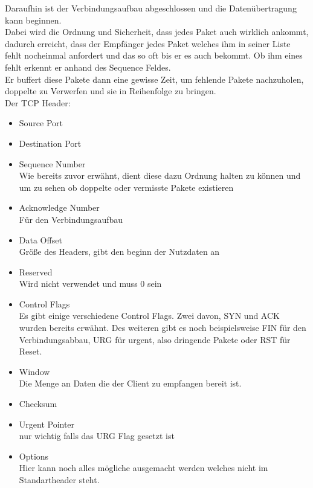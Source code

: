 \documentclass[12pt,a4paper]{report}
\begin{document}
Daraufhin ist der Verbindungsaufbau abgeschlossen und die Datenübertragung kann beginnen.\\
Dabei wird die Ordnung und Sicherheit, dass jedes Paket auch wirklich ankommt, dadurch erreicht, dass der Empfänger jedes Paket welches ihm in seiner Liste fehlt nocheinmal anfordert und das so oft bis er es auch bekommt. Ob ihm eines fehlt erkennt er anhand des Sequence Feldes.\\
Er buffert diese Pakete dann eine gewisse Zeit, um fehlende Pakete nachzuholen, doppelte zu Verwerfen und sie in Reihenfolge zu bringen.\\

Der TCP Header:\\
\begin{itemize}
\item Source Port
\item Destination Port
\item Sequence Number\\
Wie bereits zuvor erwähnt, dient diese dazu Ordnung halten zu können und um zu sehen ob doppelte oder vermisste Pakete existieren
\item Acknowledge Number\\
Für den Verbindungsaufbau
\item Data Offset\\
Größe des Headers, gibt den beginn der Nutzdaten an
\item Reserved\\
Wird nicht verwendet und muss 0 sein
\item Control Flags\\
Es gibt einige verschiedene Control Flags. Zwei davon, SYN und ACK wurden bereits erwähnt. Des weiteren gibt es noch beispielsweise FIN für den Verbindungsabbau, URG für urgent, also dringende Pakete oder RST für Reset.
\item Window \\
Die Menge an Daten die der Client zu empfangen bereit ist.
\item Checksum
\item Urgent Pointer\\
nur wichtig falls das URG Flag gesetzt ist
\item Options\\
Hier kann noch alles mögliche ausgemacht werden welches nicht im Standartheader steht.
\end{itemize}
\end{document}
